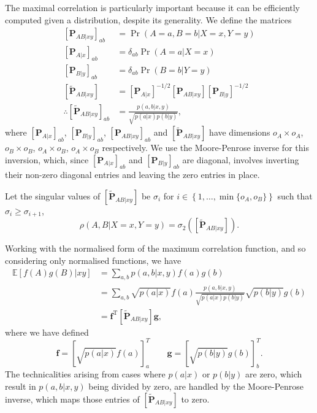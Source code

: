 \documentclass[10pt, a4paper]{article}
\numberwithin{equation}{section} %
\theoremstyle{definition}
\theoremstyle{plain}
\newcommand{\dintv}[2]{\left\{#1,\ldots,#2\right\}}
\newcommand{\?}{\mathrel{?}} %
\newcommand{\cvec}[1]{\boldsymbol{\mathbf{#1}}}    %
\newcommand{\rvec}[1]{\boldsymbol{\mathbf{#1}}^{\mathrm{T}}} %
\newcommand{\matrp}[2]{\left[\mathbf{#1}#2\right]} %
\newcommand{\E}{\mathbb{E}} %
\begin{document}
    The maximal correlation is particularly important because it can be efficiently computed given a distribution, despite its generality. We define the matrices
    \begin{align}
      \matrp{P}{_{AB|xy}}_{ab} &= \Pr(A = a, B = b|X = x, Y = y) \\
      \matrp{P}{_{A|x}}_{ab} &= \delta_{ab} \Pr(A = a|X = x) \\
      \matrp{P}{_{B|y}}_{ab} &= \delta_{ab} \Pr(B = b|Y = y) \\
      \matrp{\tilde{P}}{_{AB|xy}} &= \matrp{P}{_{A|x}}^{-1/2} \matrp{P}{_{AB|xy}} \matrp{P}{_{B|y}}^{-1/2} \\
      \therefore \matrp{\tilde{P}}{_{AB|xy}}_{ab} &= \frac{p(a,b|x,y)}{\sqrt{p(a|x)p(b|y)}},
    \end{align}
    where \(\matrp{P}{_{A|x}}_{ab}\), \(\matrp{P}{_{B|y}}_{ab}\), \(\matrp{P}{_{AB|xy}}_{ab}\) and \(\matrp{\tilde{P}}{_{AB|xy}}\) have dimensions \(o_A \times o_A\), \(o_B \times o_B\), \(o_A \times o_B\), \(o_A \times o_B\) respectively. We use the Moore-Penrose inverse for this inversion, which, since \(\matrp{P}{_{A|x}}_{ab}\) and \(\matrp{P}{_{B|y}}_{ab}\) are diagonal, involves inverting their non-zero diagonal entries and leaving the zero entries in place.

    Let the singular values of \(\matrp{\tilde{P}}{_{AB|xy}}\) be \(\sigma_i\) for \(i \in \dintv{1}{\min\{o_A, o_B\}}\) such that \(\sigma_{i} \geq \sigma_{i+1}\),
    \begin{equation}
      \rho(A,B|X=x,Y=y) = \sigma_2\left( \matrp{\tilde{P}}{_{AB|xy}} \right).
    \end{equation}

    Working with the normalised form of the maximum correlation function, and so considering only normalised functions, we have
    \begin{align}
      \E[f(A)g(B)|xy] &= \sum_{a,b} p(a,b|x,y) f(a)g(b) \\
                      &= \sum_{a,b} \sqrt{p(a|x)} f(a) \frac{p(a,b|x,y)}{\sqrt{p(a|x)p(b|y)}} \sqrt{p(b|y)} g(b) \\
                      &= \rvec{f} \matrp{\tilde{P}}{_{AB|xy}} \cvec{g},
    \end{align}
    where we have defined
    \begin{equation}
      \cvec{f} = {[\sqrt{p(a|x)} f(a)]}^T_a \qquad \cvec{g} = {[\sqrt{p(b|y)} g(b)]}^T_b.
    \end{equation}
    The technicalities arising from cases where \(p(a|x)\) or \(p(b|y)\) are zero, which result in \(p(a,b|x,y)\) being divided by zero, are handled by the Moore-Penrose inverse, which maps those entries of \(\matrp{\tilde{P}}{_{AB|xy}}\) to zero.
\end{document}
